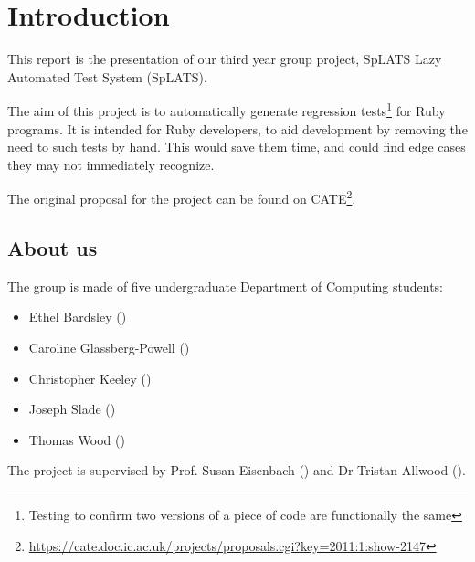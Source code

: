 \chapter{Introduction}

This report is the presentation of our third year group project, SpLATS Lazy Automated Test System (SpLATS).

The aim of this project is to automatically generate regression tests\footnote{Testing to confirm two versions of a piece of code are functionally the same} for Ruby programs.
It is intended for Ruby developers, to aid development by removing the need to such tests by hand.
This would save them time, and could find edge cases they may not immediately recognize.

The original proposal for the project can be found on CATE\footnote{\url{https://cate.doc.ic.ac.uk/projects/proposals.cgi?key=2011:1:show-2147}}.

\section{About us}
  The group is made of five undergraduate Department of Computing students:
  \begin{itemize}
    \item{Ethel Bardsley ()}
    \item{Caroline Glassberg-Powell ()}
    \item{Christopher Keeley ()}
    \item{Joseph Slade ()}
    \item{Thomas Wood ()}
  \end{itemize}

  The project is supervised by Prof. Susan Eisenbach () and Dr Tristan Allwood ().
